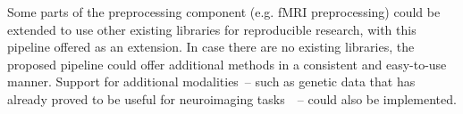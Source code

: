 Some parts of the preprocessing component (e.g. fMRI preprocessing) could be extended to use other existing libraries for reproducible research, with this pipeline offered as an extension. In case there are no existing libraries, the proposed pipeline could offer additional methods in a consistent and easy-to-use manner. Support for additional modalities~– such as genetic data that has already proved to be useful for neuroimaging tasks~\cite{cole2018brain,parisot2018disease}~– could also be implemented.








